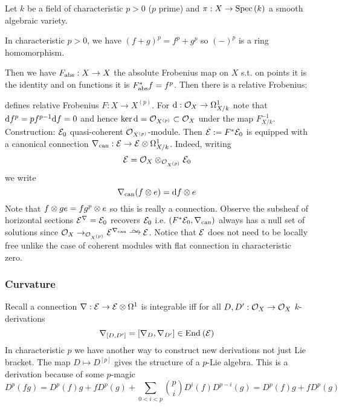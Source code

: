 \documentclass[12pt]{article}
\begin{document}
Let $k$ be a field of characteristic $p > 0$ ($p$ prime) and $\pi : X \to \mathrm{Spec}\left( k \right)$ a smooth algebraic variety. 

\begin{rmk}
In characteristic $p > 0$, we have $(f + g)^p = f^p + g^p$ so $(-)^p$ is a ring homomorphism. 
\end{rmk}

Then we have $F_{\mathrm{abs}} : X \to X$ the absolute Frobenius map on $X$ s.t. on points it is the identity and on functions it is $F^*_{\mathrm{abs}} f = f^p$. Then there is a relative Frobenius:
\begin{center}
\end{center}
defines relative Frobenius $F : X \to X^{(p)}$. For $\mathrm{d} : \mathcal{O}_{X} \to \Omega^1_{X/k}$ note that $\mathrm{d}{f^p} = p f^{p-1} \mathrm{d}{f} = 0$ and hence $\ker{\mathrm{d}} = \mathcal{O}_{X^{(p)}} \subset \mathcal{O}_{X}$ under the map $F_{X/k}^{-1}$. 
\\
Construction: $\mathcal{E}_0$ quasi-coherent $\mathcal{O}_{X^{(p)}}$-module. Then $\mathcal{E} := F^* \mathcal{E}_0$ is equipped with a canonical connection $\nabla_{\mathrm{can}} : \mathcal{E} \to \mathcal{E} \otimes \Omega_{X/k}^1$. Indeed, writing
\[ \mathcal{E} = \mathcal{O}_{X} \otimes_{\mathcal{O}_{X^{(p)}}} \mathcal{E}_0 \]
we write
\[ \nabla_{\mathrm{can}}(f \otimes e) = \mathrm{d}{f} \otimes e \]
Note that $f \otimes g e = f g^p \otimes e$ so this is really a connection. Observe the subsheaf of horizontal sections $\mathcal{E}^{\nabla} = \mathcal{E}_0$ recovers $\mathcal{E}_0$ i.e. $(F^* \mathcal{E}_0, \nabla_{\mathrm{can}})$ always has a null set of solutions since $\struct{X} \to_{\struct{X^{(p)}}} \E^{\nabla_{\can}} \iso \E$. Notice that $\mathcal{E}$ does not need to be locally free unlike the case of coherent modules with flat connection in characteristic zero.

\subsubsection{Curvature}

Recall a connection $\nabla : \mathcal{E} \to \mathcal{E} \otimes \Omega^1$ is integrable iff for all $D, D' : \mathcal{O}_{X} \to \mathcal{O}_{X}$ $k$-derivations 
\[ \nabla_{[D, D']} = [\nabla_D, \nabla_{D'}] \in \mathrm{End}_{} \left( \mathcal{E} \right) \]
In characteristic $p$ we have another way to construct new derivations not just Lie bracket. The map $D \mapsto D^{[p]}$ gives the structure of a $p$-Lie algebra. This is a derivation because of some $p$-magic
\[ D^p (fg) = D^p(f) g + f D^p(g) + \sum_{0 < i < p} {p \choose i} D^i(f) D^{p-i}(g) = D^p(f) g + f D^p(g) \]
\end{document}
